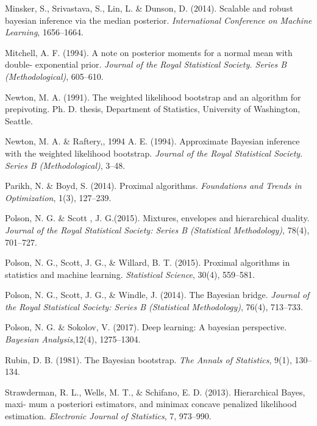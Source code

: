 \documentclass[12pt]{TD-CJS}
\begin{document}
\begin{thebibliography}{}
Minsker, S., Srivastava, S.,  Lin, L. \& Dunson, D. (2014). Scalable and robust bayesian inference via the median posterior. {\it International Conference on Machine Learning}, 1656--1664.

Mitchell, A. F. (1994). A note on posterior moments for a normal mean with double- exponential prior. {\it Journal of the Royal Statistical Society. Series B (Methodological)}, 605--610.

Newton, M. A. (1991). The weighted likelihood bootstrap and an algorithm for prepivoting. Ph. D. thesis, Department of Statistics, University of Washington, Seattle.

Newton, M. A. \& Raftery,, 1994 A. E.  (1994). Approximate Bayesian inference with the weighted likelihood bootstrap. {\it Journal of the Royal Statistical Society. Series B (Methodological)}, 3--48.

Parikh, N. \&  Boyd, S. (2014). Proximal algorithms. {\it Foundations and Trends in Optimization}, 1(3), 127--239.

Polson, N. G. \&  Scott , J. G.(2015). Mixtures, envelopes and hierarchical duality. {\it Journal of the Royal Statistical Society: Series B (Statistical Methodology)},  78(4), 701--727.

Polson, N. G.,  Scott, J. G., \& Willard, B. T.  (2015). Proximal algorithms in statistics and machine learning. {\it Statistical Science}, 30(4), 559--581.

Polson, N. G.,  Scott, J. G., \& Windle, J. (2014). The Bayesian bridge. {\it Journal of the Royal Statistical Society: Series B (Statistical Methodology)}, 76(4), 713--733.

Polson, N. G. \&  Sokolov, V. (2017). Deep learning: A bayesian perspective. {\it Bayesian Analysis},12(4), 1275--1304.

Rubin, D. B. (1981). The Bayesian bootstrap. {\it The Annals of Statistics}, 9(1), 130--134.

Strawderman, R. L., Wells, M. T., \& Schifano, E. D. (2013). Hierarchical Bayes, maxi- mum a posteriori estimators, and minimax concave penalized likelihood estimation. {\it Electronic Journal of Statistics}, 7, 973--990.


\end{thebibliography}
\end{document}
